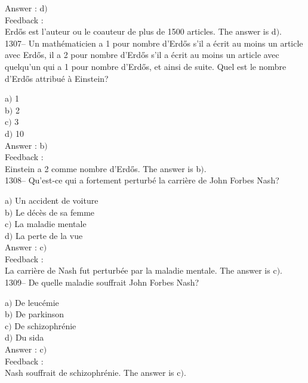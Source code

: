 \documentclass[letterpaper, 12pt]{article}
\begin{document}
Answer : d$)$\\

Feedback : \\
Erd\H{o}s est l'auteur ou le coauteur de plus de 1500 articles.
The answer is  d$)$.\\

1307-- Un math\'ematicien a 1 pour nombre d'Erd\H{o}s s'il a \'ecrit
au moins un article avec Erd\H{o}s, il a 2 pour nombre d'Erd\H{o}s
s'il a \'ecrit au moins un article avec quelqu'un qui a 1 pour
nombre d'Erd\H{o}s, et ainsi de suite. Quel est le nombre
d'Erd\H{o}s attribu\'e \`a Einstein?

a$)$ 1 \\
b$)$ 2 \\
c$)$ 3 \\
d$)$ 10\\

Answer : b$)$\\

Feedback : \\
Einstein a 2 comme nombre d'Erd\H{o}s.
The answer is  b$)$.\\

1308-- Qu'est-ce qui a fortement perturb\'e la carri\`ere de John
Forbes Nash?

a$)$ Un accident de voiture \\
b$)$ Le d\'ec\`es de sa femme \\
c$)$ La maladie mentale \\
d$)$ La perte de la vue\\

Answer : c$)$\\

Feedback : \\
La carri\`ere de Nash fut perturb\'ee par la maladie mentale.
The answer is  c$)$.\\

1309-- De quelle maladie souffrait John Forbes Nash?

a$)$ De leuc\'emie \\
b$)$ De parkinson \\
c$)$ De schizophr\'enie \\
d$)$ Du sida\\

Answer : c$)$\\

Feedback : \\
Nash souffrait de schizophr\'enie.
The answer is  c$)$.\\
\end{document}
